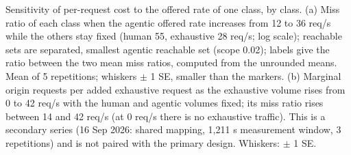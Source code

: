 Sensitivity of per-request cost to the offered rate of one class, by class. (a) Miss ratio of each class when the agentic offered rate increases from 12 to 36 req/s while the others stay fixed (human 55, exhaustive 28 req/s; log scale); reachable sets are separated, smallest agentic reachable set (scope 0.02); labels give the ratio between the two mean miss ratios, computed from the unrounded means. Mean of 5 repetitions; whiskers $\pm$ 1 SE, smaller than the markers. (b) Marginal origin requests per added exhaustive request as the exhaustive volume rises from 0 to 42 req/s with the human and agentic volumes fixed; its miss ratio rises between 14 and 42 req/s (at 0 req/s there is no exhaustive traffic). This is a secondary series (16 Sep 2026: shared mapping, 1,211 s measurement window, 3 repetitions) and is not paired with the primary design. Whiskers: $\pm$ 1 SE.
